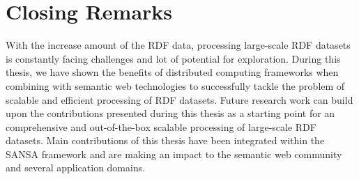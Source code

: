 \section{Closing Remarks}
With the increase amount of the RDF data, processing large-scale RDF datasets is constantly facing challenges and lot of potential for exploration.
During this thesis, we have shown the benefits of distributed computing frameworks when combining with semantic web technologies to successfully tackle the problem of scalable and efficient processing of RDF datasets.
Future research work can build upon the contributions presented during this thesis as a starting point for an comprehensive and out-of-the-box scalable processing of large-scale RDF datasets.
Main contributions of this thesis have been integrated within the SANSA framework and are making an impact to the semantic web community and several application domains.


